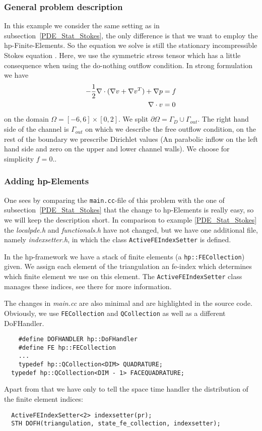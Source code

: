 \subsubsection{General problem description}
In this example we consider the same setting as in subsection~\ref{PDE_Stat_Stokes}, the only
difference is that we want to employ the hp-Finite-Elements. So the equation we solve is still 
the stationary incompressible Stokes equation . Here,
we use the symmetric stress tensor which has a little consequence when using 
the do-nothing outflow condition. In strong formulation we have
\begin{align} 
-\frac{1}{2}\nabla\cdot (\nabla v + \nabla v^{T}) + \nabla p &= f \\ 
\nabla \cdot v &= 0 \notag
\end{align} 
on the domain $\Omega = [-6,6]\times [0,2]$.  We split $\partial \Omega = \Gamma_D \cup \Gamma_{out}$. The right hand side of the channel is $\Gamma_{out}$ on which we describe the free outflow condition, on the rest of the boundary we prescribe Dirichlet values (An parabolic inflow on the left hand side and zero on the upper and lower channel walls). We choose for simplicity $f=0$..\\

\subsubsection{Adding hp-Elements}
One sees by comparing  the \texttt{main.cc}-file of this problem with the one of subsection~\ref{PDE_Stat_Stokes} that the change to hp-Elements is really easy, so we will keep the description short. In comparison to example \ref{PDE_Stat_Stokes} the \textit{localpde.h} and \textit{functionals.h} have not changed, but we have one additional file, namely \textit{indexsetter.h}, in which the class \texttt{ActiveFEIndexSetter} is defined.

In the hp-framework we have a stack of finite elements (a \texttt{hp::FECollection}) given. We assign each element of the triangulation an fe-index which determines which finite element we use on this element. The \texttt{ActiveFEIndexSetter} class manages these indices, see there for more information.

The changes in \textit{main.cc} are also minimal and are highlighted in the source code. Obviously, we use \texttt{FECollection} and \texttt{QCollection} as well as a different DoFHandler.
\begin{verbatim}
  	#define DOFHANDLER hp::DoFHandler
  	#define FE hp::FECollection
  	...
  	typedef hp::QCollection<DIM> QUADRATURE;
  typedef hp::QCollection<DIM - 1> FACEQUADRATURE;
\end{verbatim}
Apart from that we have only to tell the space time handler the distribution of the finite element indices:
\begin{verbatim}
  ActiveFEIndexSetter<2> indexsetter(pr);
  STH DOFH(triangulation, state_fe_collection, indexsetter);
\end{verbatim}

